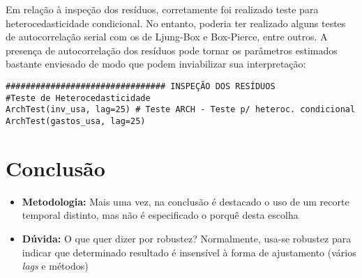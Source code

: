 \documentclass[11pt]{article}
\begin{document}
Em relação à inspeção dos resíduos, corretamente foi realizado teste para heterocedasticidade condicional.
No entanto, poderia ter realizado alguns testes de autocorrelação serial com os de Ljung-Box e Box-Pierce, entre outros. 
A presença de autocorrelação dos resíduos pode tornar os parâmetros estimados bastante enviesado de modo que podem inviabilizar sua interpretação:

\begin{verbatim}
################################ INSPEÇÃO DOS RESÍDUOS
#Teste de Heterocedasticidade
ArchTest(inv_usa, lag=25) # Teste ARCH - Teste p/ heteroc. condicional
ArchTest(gastos_usa, lag=25)
\end{verbatim}


\section{Conclusão}
\label{sec:orgd17d742}


\begin{itemize}
\item \textbf{Metodologia:} Mais uma vez, na conclusão é destacado o uso de um recorte temporal distinto, mas não é especificado o porquê desta escolha
\item \textbf{Dúvida:} O que quer dizer por robustez? Normalmente, usa-se robustez para indicar que determinado resultado é insensível à forma de ajustamento (vários \emph{lags} e métodos)
\end{itemize}
\end{document}
